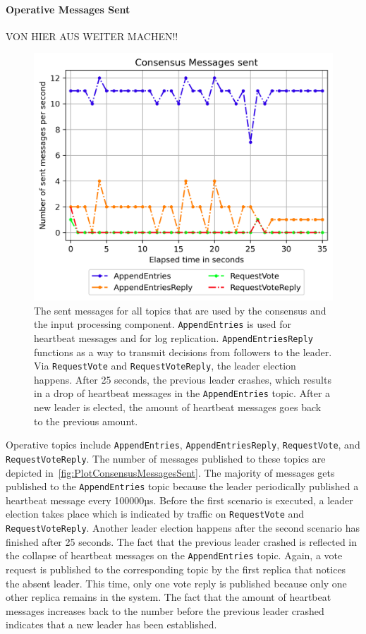 \paragraph{Operative Messages Sent}

VON HIER AUS WEITER MACHEN!!

\begin{figure}[!hb]
	\centering
	\includegraphics[width=0.75\linewidth]{images/plots/ConsensusMessagesSent}
	\caption{The sent messages for all topics that are used by the consensus and the input processing component. \texttt{AppendEntries} is used for heartbeat messages and for log replication. \texttt{AppendEntriesReply} functions as a way to transmit decisions from followers to the leader. Via \texttt{RequestVote} and \texttt{RequestVoteReply}, the leader election happens. After 25 seconds, the previous leader crashes, which results in a drop of heartbeat messages in the \texttt{AppendEntries} topic. After a new leader is elected, the amount of heartbeat messages goes back to the previous amount.}
	\label{fig:PlotConsensusMessagesSent}
\end{figure}

Operative topics include \texttt{AppendEntries}, \texttt{AppendEntriesReply}, \texttt{RequestVote}, and \texttt{RequestVoteReply}.
The number of messages published to these topics are depicted in~\autoref{fig:PlotConsensusMessagesSent}.
The majority of messages gets published to the \texttt{AppendEntries} topic because the leader periodically published a heartbeat message every 100000µs.
Before the first scenario is executed, a leader election takes place which is indicated by traffic on \texttt{RequestVote} and \texttt{RequestVoteReply}.
Another leader election happens after the second scenario has finished after 25 seconds.
The fact that the previous leader crashed is reflected in the collapse of heartbeat messages on the \texttt{AppendEntries} topic.
Again, a vote request is published to the corresponding topic by the first replica that notices the absent leader.
This time, only one vote reply is published because only one other replica remains in the system.
The fact that the amount of heartbeat messages increases back to the number before the previous leader crashed indicates that a new leader has been established.

